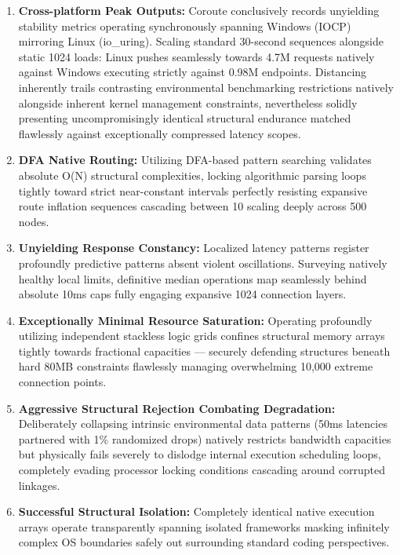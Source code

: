 \begin{enumerate}
    \item \textbf{Cross-platform Peak Outputs:} Coroute conclusively records unyielding stability metrics operating synchronously spanning Windows (IOCP) mirroring Linux (io\_uring). Scaling standard 30-second sequences alongside static 1024 loads: Linux pushes seamlessly towards 4.7M requests natively against Windows executing strictly against 0.98M endpoints. Distancing inherently trails contrasting environmental benchmarking restrictions natively alongside inherent kernel management constraints, nevertheless solidly presenting uncompromisingly identical structural endurance matched flawlessly against exceptionally compressed latency scopes.
    
    \item \textbf{DFA Native Routing:} Utilizing DFA-based pattern searching validates absolute O(N) structural complexities, locking algorithmic parsing loops tightly toward strict near-constant intervals perfectly resisting expansive route inflation sequences cascading between 10 scaling deeply across 500 nodes.
    
    \item \textbf{Unyielding Response Constancy:} Localized latency patterns register profoundly predictive patterns absent violent oscillations. Surveying natively healthy local limits, definitive median operations map seamlessly behind absolute 10ms caps fully engaging expansive 1024 connection layers.
    
    \item \textbf{Exceptionally Minimal Resource Saturation:} Operating profoundly utilizing independent stackless logic grids confines structural memory arrays tightly towards fractional capacities --- securely defending structures beneath hard 80MB constraints flawlessly managing overwhelming 10,000 extreme connection points.
    
    \item \textbf{Aggressive Structural Rejection Combating Degradation:} Deliberately collapsing intrinsic environmental data patterns (50ms latencies partnered with 1\% randomized drops) natively restricts bandwidth capacities but physically fails severely to dislodge internal execution scheduling loops, completely evading processor locking conditions cascading around corrupted linkages.
    
    \item \textbf{Successful Structural Isolation:} Completely identical native execution arrays operate transparently spanning isolated frameworks masking infinitely complex OS boundaries safely out surrounding standard coding perspectives.
\end{enumerate}

